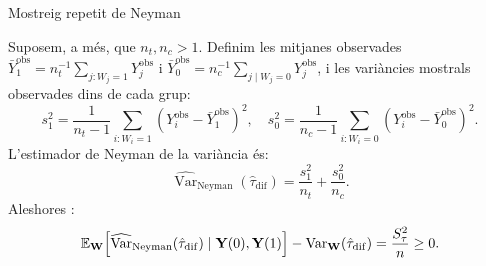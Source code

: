 \documentclass{bestbeamer}
\begin{document}
\begin{frame}[allowframebreaks]{Mostreig repetit de Neyman}
\begin{corollary}\label{cor:variancia-neyman-conservadora}
Suposem, a més, que $n_t,n_c>1$. Definim les mitjanes observades $\bar{Y}^{\operatorname{obs}}_1=n_t^{-1}\sum_{j:W_j=1}Y_j^{\operatorname{obs}}$ i $\bar{Y}^{\operatorname{obs}}_0=n_c^{-1}\sum_{j\mid W_j=0}Y_j^{\operatorname{obs}}$, i les variàncies mostrals observades dins de cada grup:
\begin{equation*}
s_1^2=\frac{1}{n_t-1}\sum_{i:W_i=1}\left(Y_i^{\operatorname{obs}}-\bar{Y}^{\operatorname{obs}}_1\right)^2,\quad
s_0^2=\frac{1}{n_c-1}\sum_{i:W_i=0}\left(Y_i^{\operatorname{obs}}-\bar{Y}^{\operatorname{obs}}_0\right)^2.
\end{equation*}
L'estimador de Neyman de la variància és:
\begin{equation*}
\widehat{\operatorname{Var}}_{\operatorname{Neyman}}(\hat\tau_{\operatorname{dif}})
=
\frac{s_1^2}{n_t}+\frac{s_0^2}{n_c}.
\end{equation*}
Aleshores \cite[Sec.~6.5]{imbens2015causal}:
\begin{equation*}
\mathbb{E}_{\mathbf{W}}\!\left[\widehat{\operatorname{Var}}_{\operatorname{Neyman}}(\hat\tau_{\operatorname{dif}})\mid \mathbf{Y}(0),\mathbf{Y}(1)\right]
-
\operatorname{Var}_{\mathbf{W}}(\hat\tau_{\operatorname{dif}})
=
\frac{S_\tau^2}{n}\geq 0.
\end{equation*}
\end{corollary}
\end{frame}
\end{document}
